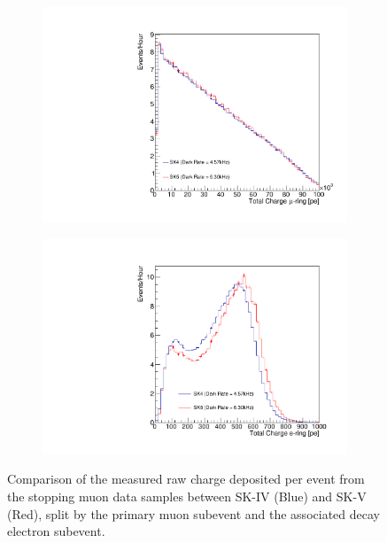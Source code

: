 \begin{figure}[h]
  \begin{subfigure}[t]{0.48\textwidth}
    \includegraphics[width=\textwidth, trim={0mm 0mm 0mm 0mm}, clip, page=1]{Figures/Selections/ChargeAssociatedWithMuon.pdf}
  \end{subfigure}%
  \begin{subfigure}[t]{0.48\textwidth}
    \includegraphics[width=\textwidth, trim={0mm 0mm 0mm 0mm}, clip, page=1]{Figures/Selections/ChargeAssociatedWithDecayE.pdf}
  \end{subfigure}  
  \caption{Comparison of the measured raw charge deposited per event from the stopping muon data samples between SK-IV (Blue) and SK-V (Red), split by the primary muon subevent and the associated decay electron subevent.}
  \label{fig:Selection_MeasuredChargeDistribution}
\end{figure}

